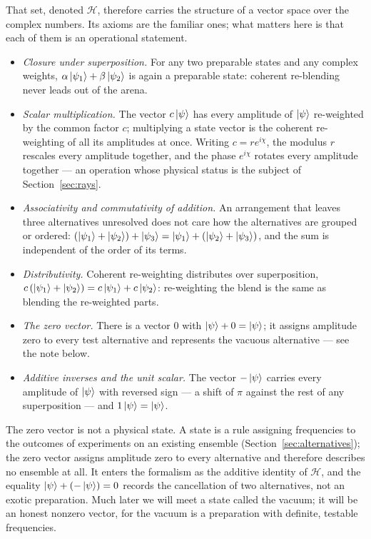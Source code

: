 That set, denoted $\mathcal{H}$, therefore carries the structure of a vector space over the complex numbers. Its axioms are the familiar ones; what matters here is that each of them is an operational statement.
\begin{itemize}
    \item \emph{Closure under superposition.} For any two preparable states and any complex weights, $\alpha\ket{\psi_1}+\beta\ket{\psi_2}$ is again a preparable state: coherent re-blending never leads out of the arena.
    \item \emph{Scalar multiplication.} The vector $c\ket{\psi}$ has every amplitude of $\ket{\psi}$ re-weighted by the common factor $c$; multiplying a state vector is the coherent re-weighting of all its amplitudes at once. Writing $c=re^{i\chi}$, the modulus $r$ rescales every amplitude together, and the phase $e^{i\chi}$ rotates every amplitude together --- an operation whose physical status is the subject of Section~\ref{sec:rays}.
    \item \emph{Associativity and commutativity of addition.} An arrangement that leaves three alternatives unresolved does not care how the alternatives are grouped or ordered: $(\ket{\psi_1}+\ket{\psi_2})+\ket{\psi_3}=\ket{\psi_1}+(\ket{\psi_2}+\ket{\psi_3})$, and the sum is independent of the order of its terms.
    \item \emph{Distributivity.} Coherent re-weighting distributes over superposition, $c\,(\ket{\psi_1}+\ket{\psi_2})=c\ket{\psi_1}+c\ket{\psi_2}$: re-weighting the blend is the same as blending the re-weighted parts.
    \item \emph{The zero vector.} There is a vector $0$ with $\ket{\psi}+0=\ket{\psi}$; it assigns amplitude zero to every test alternative and represents the vacuous alternative --- see the note below.
    \item \emph{Additive inverses and the unit scalar.} The vector $-\ket{\psi}$ carries every amplitude of $\ket{\psi}$ with reversed sign --- a shift of $\pi$ against the rest of any superposition --- and $1\ket{\psi}=\ket{\psi}$.
\end{itemize}

\begin{note}
The zero vector is not a physical state. A state is a rule assigning frequencies to the outcomes of experiments on an existing ensemble (Section~\ref{sec:alternatives}); the zero vector assigns amplitude zero to every alternative and therefore describes no ensemble at all. It enters the formalism as the additive identity of $\mathcal{H}$, and the equality $\ket{\psi}+(-\ket{\psi})=0$ records the cancellation of two alternatives, not an exotic preparation. Much later we will meet a state called the vacuum; it will be an honest nonzero vector, for the vacuum is a preparation with definite, testable frequencies.
\end{note}

